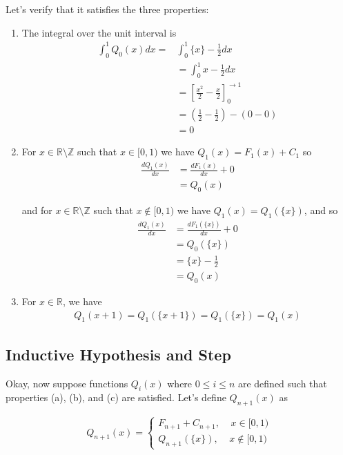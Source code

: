 \documentclass{article}
\newcommand{\R}{\mathbb{R}}
\begin{document}
\vskip 0.5cm
Let's verify that it satisfies the three properties:
\begin{enumerate}[label=(\alph*)]
  \item The integral over the unit interval is 
  \begin{align*}
    \int_{0}^{1} Q_0(x) dx = &\int_{0}^{1} \{x\} - \frac{1}{2} dx \\
    &= \int_{0}^{1} x - \frac{1}{2} dx \\
    &= \left[ \frac{x^2}{2} - \frac{x}{2} \right]_{0}^{\rightarrow 1} \\
    &= \left(\frac{1}{2} - \frac{1}{2} \right) - \left( 0 - 0 \right) \\
    &= 0 
  \end{align*}

  \vskip 0.5cm
  \item For $x \in \R \setminus \mathbb{Z}$ such that $x \in [0, 1)$ we have $Q_1(x) = F_1(x) + C_1$ so 
  \begin{align*}
    \frac{dQ_1(x)}{dx} &= \frac{dF_1(x)}{dx} + 0 \\
    &= Q_0(x)
  \end{align*}

  and for $x \in \R \setminus \mathbb{Z}$ such that $x \not\in [0, 1)$ we have $Q_1(x) = Q_1(\{x\})$, and so 
  \begin{align*}
    \frac{dQ_1(x)}{dx} &= \frac{dF_1(\{x\})}{dx} + 0 \\
    &= Q_0(\{x\}) \\
    &= \{x\} - \frac{1}{2} \\
    &= Q_0(x)
  \end{align*}

  \vskip 0.5cm
  \item For $x \in \R$, we have 
  \begin{align*}
    Q_1(x+1) = Q_1(\{x + 1\}) = Q_1(\{x\}) = Q_1(x)
  \end{align*}
\end{enumerate}

\subsection*{Inductive Hypothesis and Step}
Okay, now suppose functions $Q_i(x)$ where $0 \leq i \leq n$ are defined such that properties (a), (b), and (c) are satisfied. Let's define $Q_{n+1}(x)$ as 

\[ Q_{n+1}(x) = \begin{cases}
  F_{n+1} + C_{n+1}, \;\;\;\; x \in [0,1) \\
  Q_{n+1}(\{x\}),\;\;\;\; x \not\in [0,1)
\end{cases} \]
\end{document}

